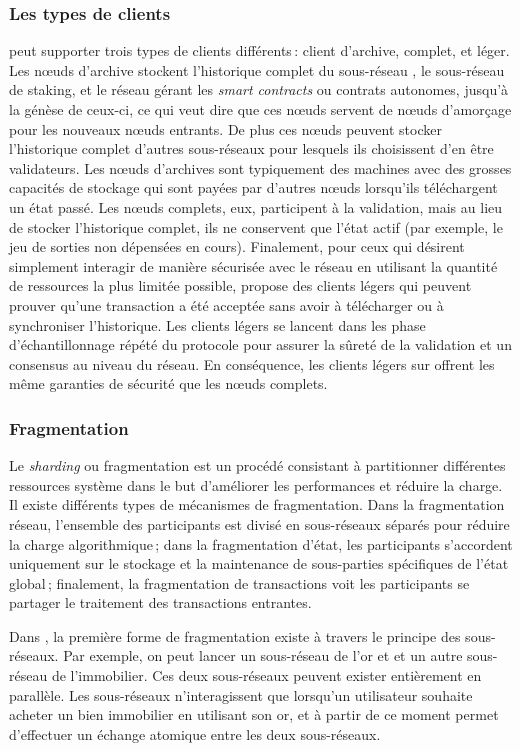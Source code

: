 \documentclass[runningheads,francais,a4paper]{llncs}
\begin{document}
\subsubsection{Les types de clients}
\AVAPlatformName{} peut supporter trois types de clients différents\,: client d'archive, complet, et léger. Les nœuds
d'archive stockent l'historique complet du sous-réseau \AVATokenName{}, le sous-réseau de staking, et le réseau gérant
les \emph{smart contracts} ou contrats autonomes, jusqu'à la génèse de ceux-ci, ce qui veut dire que ces nœuds servent de nœuds d'amorçage
pour les nouveaux nœuds entrants. De plus ces nœuds peuvent stocker l'historique complet d'autres sous-réseaux pour
lesquels ils choisissent d'en être validateurs. Les nœuds d'archives sont typiquement des machines avec des grosses
capacités de stockage qui sont payées par d'autres nœuds lorsqu'ils téléchargent un état passé. Les nœuds complets,
eux, participent à la validation, mais au lieu de stocker l'historique complet, ils ne conservent que
l'état actif (par exemple, le jeu de sorties non dépensées en cours). Finalement, pour ceux qui désirent simplement
interagir de manière sécurisée avec le réseau en utilisant la quantité de ressources la plus limitée possible,
\AVAPlatformName{} propose des clients légers qui peuvent prouver qu'une transaction a été acceptée sans avoir à
télécharger ou à synchroniser l'historique. Les clients légers se lancent dans les phase d'échantillonnage répété
du protocole pour assurer la sûreté de la validation et un consensus au niveau du réseau. En conséquence, les clients
légers sur \AVAPlatformName{} offrent les même garanties de sécurité que les nœuds complets.

\subsubsection{Fragmentation}
Le \emph{sharding} ou fragmentation est un procédé consistant à partitionner différentes ressources système dans le but d'améliorer les
performances et réduire la charge. Il existe différents types de mécanismes de fragmentation. Dans la fragmentation réseau,
l'ensemble des participants est divisé en sous-réseaux séparés pour réduire la charge algorithmique\,; dans la fragmentation
d'état, les participants s'accordent uniquement sur le stockage et la maintenance de sous-parties spécifiques de l'état global\,;
finalement, la fragmentation de transactions voit les participants se partager le traitement des
transactions entrantes.

Dans \AVAPlatformNameFirstRelease{}, la première forme de fragmentation existe à travers le principe des sous-réseaux. Par
exemple, on peut lancer un sous-réseau de l'or et et un autre sous-réseau de l'immobilier. Ces deux sous-réseaux
peuvent exister entièrement en parallèle. Les sous-réseaux n'interagissent que lorsqu'un utilisateur souhaite
acheter un bien immobilier en utilisant son or, et à partir de ce moment \AVAPlatformName{} permet d'effectuer un
échange atomique entre les deux sous-réseaux.
\end{document}
